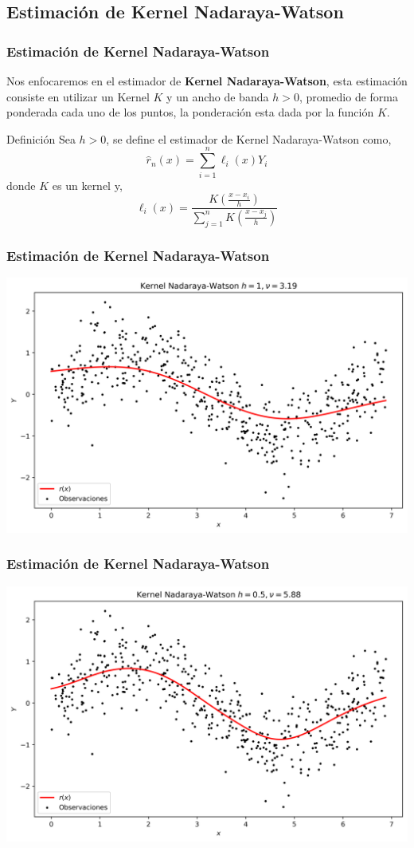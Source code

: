 \documentclass[aspectratio=169,spanish]{beamer}
\begin{document}
\begin{frame}
\section{Estimación de Kernel Nadaraya-Watson}
\frametitle{Estimación de Kernel Nadaraya-Watson}
Nos enfocaremos en el estimador de \textbf{Kernel Nadaraya-Watson}, esta estimación consiste en utilizar un Kernel $K$ y un ancho de banda $h>0$, promedio de forma ponderada cada uno de los puntos, la ponderación esta dada por la función $K$.
\begin{block}{Definición}
Sea $h>0$, se define el estimador de Kernel Nadaraya-Watson como, 
$$\hat{r}_n(x)=\sum_{i=1}^{n}\ell_i(x)Y_i$$
donde $K$ es un kernel y, 
$$\ell_i(x)=\frac{K\left(\frac{x-x_i}{h}\right)}{\sum_{j=1}^{n}K\left(\frac{x-x_j}{h}\right)} $$

\end{block}
\end{frame}



\begin{frame}
\frametitle{Estimación de Kernel Nadaraya-Watson}
\center
\includegraphics[scale=0.5]{regresion8}
\end{frame}


\begin{frame}
\frametitle{Estimación de Kernel Nadaraya-Watson}
\center
\includegraphics[scale=0.5]{regresion9}
\end{frame}
\end{document}
